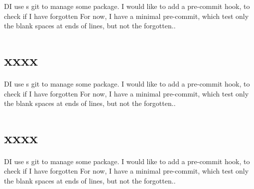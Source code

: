 \documentclass[a4paper, oneside, notitlepage, 12pt]{article}
\begin{document}
\endnumbering
\newpage


DI use s git to manage some package.
I would like to add a pre-commit hook, to check if I have forgotten
For now, I have a minimal pre-commit, which test only the blank spaces at ends of lines, but not the forgotten..
\section{xxxx}
DI use s git to manage some package.
I would like to add a pre-commit hook, to check if I have forgotten
For now, I have a minimal pre-commit, which test only the blank spaces at ends of lines, but not the forgotten..
\section{xxxx}

DI use s git to manage some package.
I would like to add a pre-commit hook, to check if I have forgotten
For now, I have a minimal pre-commit, which test only the blank spaces at ends of lines, but not the forgotten..
\end{document}
